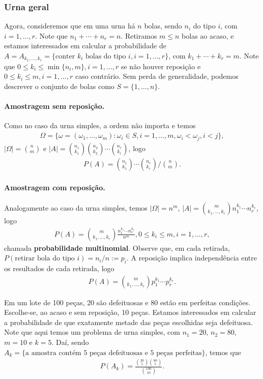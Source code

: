 \documentclass[../Notas.tex]{subfiles}
\begin{document}
\subsubsection{Urna geral}
Agora, consideremos que em uma urna há $n$ bolas, sendo $n_i$ do tipo $i$, com $i = 1, \dots, r$. Note que $n_1 + \cdots + n_r = n$. Retiramos $m\leq n$ bolas ao acaso, e estamos interessados em calcular a probabilidade de $A = A_{k_1, \dots, k_r} = \{ \text{conter } k_i \text{ bolas do tipo } i, i = 1, \dots, r \}$, com $k_1 + \cdots + k_r = m$. Note que $0\leq k_i\leq\min\{n_i, m\}, i=1, \dots, r$ se não houver reposição e $0\leq k_i\leq m, i=1, \dots, r$ caso contrário. Sem perda de generalidade, podemos descrever o conjunto de bolas como $S = \{1, \dots, n \}$.

\paragraph{Amostragem sem reposição.} Como no caso da urna simples, a ordem não importa e temos
\begin{align*}
    \Omega = \{ \omega = (\omega_1, \dots, \omega_m) : \omega_i\in S, i=1, \dots, m, \omega_i<\omega_j, i<j \},
\end{align*}
$|\Omega| = \displaystyle{\binom{n}{m}}$ e $|A| = \displaystyle{ \binom{n_1}{k_1}\binom{n_2}{k_2}\cdots\binom{n_r}{k_r} }$, logo 
\begin{align*}
P(A) = \displaystyle{ \binom{n_1}{k_1}\cdots\binom{n_r}{k_r}/\binom{n}{m}}.
\end{align*}
\paragraph{Amostragem com reposição.} Analogamente ao caso da urna simples, temos $|\Omega| = n^m$, $|A| = \displaystyle{ \binom{m}{k_1, \dots, k_r}n_1^{k_1}\cdots n_r^{k_r} }$, logo 
\begin{align*}
    P(A) = \binom{m}{k_1, \dots, k_r}\frac{n_1^{k_1}\cdots n_r^{k_r}}{n^m}, 0\leq k_i\leq m, i = 1, \dots, r,
\end{align*}
chamada \textbf{probabilidade multinomial}. Observe que, em cada retirada, $P(\text{retirar bola do tipo } i) = n_i/n := p_i$. A reposição implica independência entre os resultados de cada retirada, logo
\begin{align*}
    P(A) = \binom{m}{k_1, \dots, k_r}p_1^{k_1}\cdots p_r^{k_r}.
\end{align*}
\begin{example}
Em um lote de 100 peças, 20 são defeituosas e 80 estão em perfeitas condições. Escolhe-se, ao acaso e sem reposição, 10 peças. Estamos interessados em calcular a probabilidade de que exatamente metade das peças escolhidas seja defeituosa. Note que aqui temos um problema de urna simples, com $n_1 = 20$, $n_2 = 80$, $m = 10$ e $k = 5$. Daí, sendo $A_k = \{\text{a amostra contém 5 peças defeituosas e 5 peças perfeitas}\}$, temos que
\begin{align*}
P(A_k) = \frac{\binom{20}{5}\binom{80}{5}}{\binom{100}{10}}.
\end{align*}
\end{example}
\end{document}
